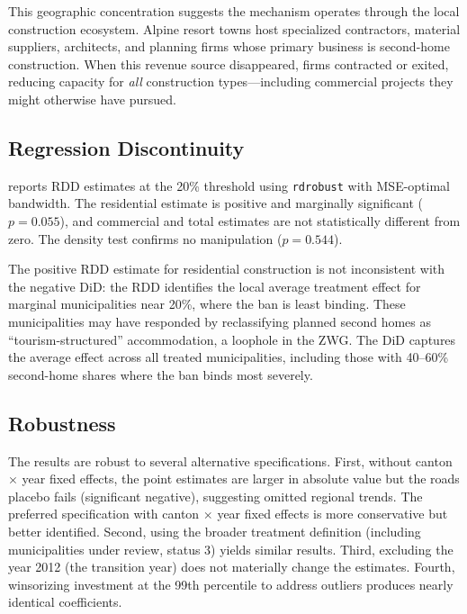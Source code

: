 \documentclass[12pt]{article}
\begin{document}
This geographic concentration suggests the mechanism operates through the local construction ecosystem. Alpine resort towns host specialized contractors, material suppliers, architects, and planning firms whose primary business is second-home construction. When this revenue source disappeared, firms contracted or exited, reducing capacity for \textit{all} construction types---including commercial projects they might otherwise have pursued.

\subsection{Regression Discontinuity}



 reports RDD estimates at the 20\% threshold using \texttt{rdrobust} with MSE-optimal bandwidth. The residential estimate is positive and marginally significant ($p = 0.055$), and commercial and total estimates are not statistically different from zero. The density test confirms no manipulation ($p = 0.544$).

The positive RDD estimate for residential construction is not inconsistent with the negative DiD: the RDD identifies the local average treatment effect for marginal municipalities near 20\%, where the ban is least binding. These municipalities may have responded by reclassifying planned second homes as ``tourism-structured'' accommodation, a loophole in the ZWG. The DiD captures the average effect across all treated municipalities, including those with 40--60\% second-home shares where the ban binds most severely.

\subsection{Robustness}

The results are robust to several alternative specifications. First, without canton $\times$ year fixed effects, the point estimates are larger in absolute value but the roads placebo fails (significant negative), suggesting omitted regional trends. The preferred specification with canton $\times$ year fixed effects is more conservative but better identified. Second, using the broader treatment definition (including municipalities under review, status 3) yields similar results. Third, excluding the year 2012 (the transition year) does not materially change the estimates. Fourth, winsorizing investment at the 99th percentile to address outliers produces nearly identical coefficients.
\end{document}
